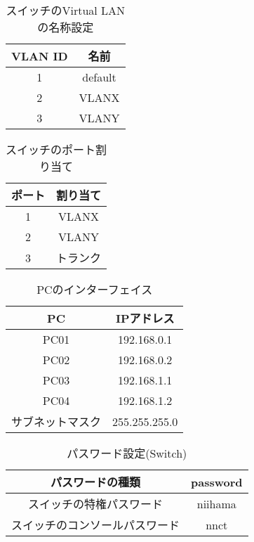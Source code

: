 \documentclass{jsarticle}
\begin{document}
\begin{table}[htb]
  \begin{center}
    \caption{スイッチのVirtual LANの名称設定}
    \begin{tabular}{cc} \hline
      VLAN ID & 名前   \\ \hline 
      1 & default   \\
      2 & VLANX   \\
      3 & VLANY   \\ \hline
    \end{tabular}
	\label{tab:switch_VLAN}
  \end{center}
\end{table}
\begin{table}[htb]
  \begin{center}
    \caption{スイッチのポート割り当て}
    \begin{tabular}{cc} \hline
      ポート & 割り当て   \\ \hline 
      1 & VLANX   \\
      2 & VLANY   \\
      3 & トランク   \\ \hline
    \end{tabular}
	\label{tab:switch_port}
  \end{center}
\end{table}
\begin{table}[htb]
  \begin{center}
    \caption{PCのインターフェイス}
    \begin{tabular}{cc} \hline
      PC & IPアドレス   \\ \hline 
      PC01 & 192.168.0.1   \\
      PC02 & 192.168.0.2   \\
      PC03 & 192.168.1.1   \\ 
      PC04 & 192.168.1.2 \\ \hline 
      サブネットマスク & 255.255.255.0 \\ \hline
    \end{tabular}
	\label{tab:PC_interface}
  \end{center}
\end{table}
\begin{table}[htb]
  \begin{center}
    \caption{パスワード設定(Switch)}
    \begin{tabular}{cc} \hline
     パスワードの種類 & password \\ \hline
      スイッチの特権パスワード & niihama   \\ 
      スイッチのコンソールパスワード & nnct \\ \hline
    \end{tabular}
	\label{tab:password}
  \end{center}
\end{table}
\end{document}
